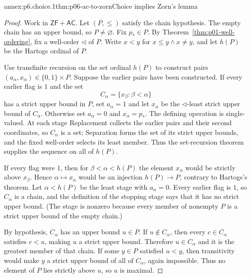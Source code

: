 \begin{annexitem}{annex:p6.choice.1}{thm:p06-ac-to-zorn}{Choice implies Zorn's lemma}
\begin{proof}
Work in \(\mathsf{ZF}+\mathsf{AC}\).  Let \((P,\leq)\) satisfy the chain
hypothesis.  The empty chain has an upper bound, so \(P\ne\varnothing\).
Fix \(p_*\in P\).  By Theorem~\ref{thm:p01-well-ordering}, fix a well-order
\(\triangleleft\) of \(P\).  Write \(x<y\) for
\(x\leq y\land x\ne y\), and let \(h(P)\) be the Hartogs ordinal of \(P\).

Use transfinite recursion on the set ordinal \(h(P)\) to construct pairs
\((a_\alpha,x_\alpha)\in\{0,1\}\times P\).  Suppose the earlier pairs have
been constructed.  If every earlier flag is \(1\) and the set
\[
  C_\alpha=\{x_\beta:\beta<\alpha\}
\]
has a strict upper bound in \(P\), set \(a_\alpha=1\) and let
\(x_\alpha\) be the \(\triangleleft\)-least strict upper bound of
\(C_\alpha\).  Otherwise set \(a_\alpha=0\) and
\(x_\alpha=p_*\).  The defining operation is single-valued.  At each stage
Replacement collects the earlier pairs and their second coordinates, so
\(C_\alpha\) is a set; Separation forms the set of its strict upper bounds,
and the fixed well-order selects its least member.  Thus the set-recursion
theorem supplies the sequence on all of \(h(P)\).

If every flag were \(1\), then for \(\beta<\alpha<h(P)\) the element
\(x_\alpha\) would be strictly above \(x_\beta\).  Hence
\(\alpha\mapsto x_\alpha\) would be an injection \(h(P)\to P\),
contrary to Hartogs's theorem.  Let \(\alpha<h(P)\) be the least stage with
\(a_\alpha=0\).  Every earlier flag is \(1\), so \(C_\alpha\) is a chain,
and the definition of the stopping stage says that it has no strict upper
bound.  (The stage is nonzero because every member of nonempty \(P\) is a
strict upper bound of the empty chain.)

By hypothesis, \(C_\alpha\) has an upper bound \(u\in P\).  If
\(u\notin C_\alpha\), then every \(c\in C_\alpha\) satisfies
\(c<u\), making \(u\) a strict upper bound.  Therefore
\(u\in C_\alpha\) and it is the greatest member of that chain.  If some
\(y\in P\) satisfied \(u<y\), then transitivity would make \(y\) a strict
upper bound of all of \(C_\alpha\), again impossible.  Thus no element of
\(P\) lies strictly above \(u\), so \(u\) is maximal.
\end{proof}
\end{annexitem}

